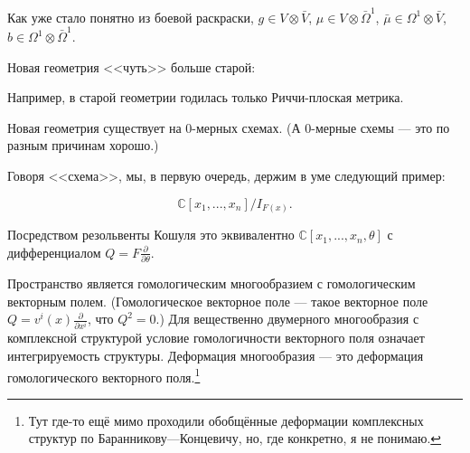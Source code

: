 \documentclass[11pt]{article}
\theoremstyle{remark}
\theoremstyle{definition}
\newcommand{\que}[1]{\footnote{\textcolor[rgb]{0.38,0.69,0.82}{#1}}}
\begin{document}
Как уже стало понятно из боевой раскраски, $g \in V \otimes \bar V$, $\mu \in V \otimes \bar \Omega^1$, $\bar \mu \in \Omega^1 \otimes \bar V$, $b \in \Omega^1 \otimes \bar \Omega^1$.

Новая геометрия <<чуть>> больше старой:

\begin{center}
\end{center}

Например, в старой геометрии годилась только Риччи-плоская метрика.

Новая геометрия существует на 0-мерных схемах. (А 0-мерные схемы --- это по разным причинам хорошо.)



\footnotesize{}

Говоря <<схема>>, мы, в первую очередь, держим в уме следующий пример:

$$\mathbb{C}[x_1, ..., x_n] / I_{F(x)}.$$

Посредством резольвенты Кошуля это эквивалентно $\mathbb{C}[x_1, ..., x_n, \theta]$ с дифференциалом $Q = F \frac{\partial}{\partial \theta}.$


\normalsize{}


Пространство является гомологическим многообразием с гомологическим векторным полем. (Гомологическое векторное поле --- такое векторное поле $Q = v^i (x) \frac{\partial}{\partial x^i}$, что $Q^2 = 0$.) Для вещественно двумерного многообразия с комплексной структурой условие гомологичности векторного поля означает интегрируемость структуры. Деформация многообразия --- это деформация гомологического векторного поля.\que{Тут где-то ещё мимо проходили обобщённые деформации комплексных структур по Баранникову---Концевичу, но, где конкретно, я не понимаю.}
\end{document}
